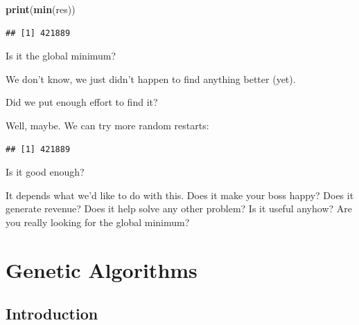 \documentclass[10pt,b5paper,krantz1]{krantz}
\newenvironment{Shaded}{\begin{snugshade}}{\end{snugshade}}
\newcommand{\DataTypeTok}[1]{\textcolor[rgb]{0.27,0.27,0.27}{#1}}
\newcommand{\DecValTok}[1]{\textcolor[rgb]{0.06,0.06,0.06}{#1}}
\newcommand{\KeywordTok}[1]{\textcolor[rgb]{0.27,0.27,0.27}{\textbf{#1}}}
\newcommand{\NormalTok}[1]{#1}
\newcommand{\OperatorTok}[1]{\textcolor[rgb]{0.43,0.43,0.43}{\textbf{#1}}}
\newcommand{\StringTok}[1]{\textcolor[rgb]{0.5,0.5,0.5}{#1}}
\renewenvironment{quote}{\begin{VF}}{\end{VF}}
\begin{document}
\begin{Shaded}
\begin{Highlighting}[]
\KeywordTok{print}\NormalTok{(}\KeywordTok{min}\NormalTok{(res))}
\end{Highlighting}
\end{Shaded}

\begin{verbatim}
## [1] 421889
\end{verbatim}

Is it the global minimum?

\begin{quote}
We don't know, we just didn't happen to find anything better (yet).
\end{quote}

Did we put enough effort to find it?

\begin{quote}
Well, maybe. We can try more random restarts:
\end{quote}

\begin{Shaded}
\end{Shaded}

\begin{verbatim}
## [1] 421889
\end{verbatim}

Is it good enough?

\begin{quote}
It depends what we'd like to do with this. Does it make your boss happy?
Does it generate revenue? Does it help solve any other problem?
Is it useful anyhow?
Are you really looking for the global minimum?
\end{quote}

\hypertarget{genetic-algorithms}{%
\section{Genetic Algorithms}\label{genetic-algorithms}}

\hypertarget{introduction-15}{%
\subsection{Introduction}\label{introduction-15}}
\end{document}
